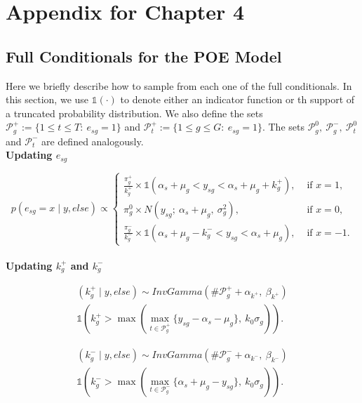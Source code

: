 

\chapter{Appendix for Chapter 4}
\label{appendix_D}

\section{Full Conditionals for the POE Model}
\label{sec:full_cond}
\vspace{0.3 cm}

Here we briefly describe how to sample from each one of the full conditionals. In this section, we use $\mathds{1}(\cdot)$ to denote either an indicator function or th support of a truncated probability distribution. We also define the sets $\mathcal{P}^+_g:=\{ 1\leq t \leq T: \ e_{sg} = 1\}$ and $\mathcal{P}^+_t:=\{ 1\leq g \leq G: \ e_{sg} = 1\}$. The sets $\mathcal{P}^0_g, \ \mathcal{P}^-_g, \ \mathcal{P}^0_t$ and $\mathcal{P}^-_t$ are defined analogously.\\

\textbf{Updating $e_{sg}$}

$$p(e_{sg} = x \mid y, else) \propto \begin{cases}
\frac{\pi^+_g}{k^+_g} \times \mathds{1}(\alpha_s + \mu_g < y_{sg} < \alpha_s + \mu_g + k^+_g), &\mbox{ if } x = 1,\\
\pi^0_g \times N(y_{sg}; \ \alpha_s + \mu_g, \ \sigma^2_g), &\mbox{ if } x = 0,\\
\frac{\pi^-_g}{k^-_g} \times \mathds{1}(\alpha_s + \mu_g - k^-_g < y_{sg} < \alpha_s + \mu_g), &\mbox{ if } x = -1.
\end{cases}$$\\

\textbf{Updating $k^+_g$ and $k^-_g$}

\begin{multline*}
(k^+_g \mid y, else) \sim InvGamma(\# \mathcal{P}^+_g + \alpha_{k^+}, \ \beta_{k^+})\\
\mathds{1}\left(k^+_g > \max \left(\max_{t \in \mathcal{P}^+_g}\{y_{sg} - \alpha_s -\mu_g\}, \ k_0 \sigma_g \right) \right).
\end{multline*}

\begin{multline*}
(k^-_g \mid y, else) \sim InvGamma(\#\mathcal{P}^-_g + \alpha_{k^-}, \ \beta_{k^-})\\
\mathds{1}\left(k^-_g > \max \left(\max_{t \in \mathcal{P}^-_g }\{\alpha_s +\mu_g - y_{sg}\}, \ k_0 \sigma_g \right) \right).
\end{multline*}

